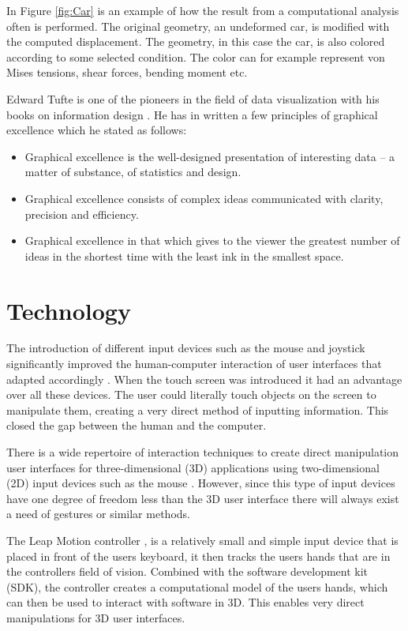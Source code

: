 In Figure \ref{fig:Car} is an example of how the result from a computational analysis often is performed. The original geometry, an undeformed car, is modified with the computed displacement. The geometry, in this case the car, is also colored according to some selected condition. The color can for example represent von Mises tensions, shear forces, bending moment etc. 

Edward Tufte is one of the pioneers in the field of data visualization with his books on information design \cite{tufte1997visual} \cite{tufte1990envisioning} \cite{tufte2001the}. He has in \cite{tufte2001the} written a few principles of graphical excellence which he stated as follows:

\begin{itemize} 
\item Graphical excellence is the well-designed presentation of interesting data – a matter of substance, of statistics and design.
\item Graphical excellence consists of complex ideas communicated with clarity, precision and efficiency.
\item Graphical excellence in that which gives to the viewer the greatest number of ideas in the shortest time with the least ink in the smallest space.
\end{itemize} 

\section{Technology}
The introduction of different input devices such as the mouse and joystick significantly improved the human-computer interaction of user interfaces that adapted accordingly \cite{Sears1990}. When the touch screen was introduced it had an advantage over all these devices. The user could literally touch objects on the screen to manipulate them, creating a very direct method of inputting information\cite{Sears1990}. This closed the gap between the human and the computer.

There is a wide repertoire of interaction techniques to create direct manipulation user interfaces for three-dimensional (3D) applications using two-dimensional (2D) input devices such as the mouse \cite{Nielson:1987:DMT:319120.319134}. However, since this type of input devices have one degree of freedom less than the 3D user interface there will always exist a need of gestures or similar methods. 

The Leap Motion controller \cite{LeapMotion2013}, is a relatively small and simple input device that is placed in front of the users keyboard, it then tracks the users hands that are in the controllers field of vision. Combined with the software development kit (SDK), the controller creates a computational model of the users hands, which can then be used to interact with software in 3D. This enables very direct manipulations for 3D user interfaces.


